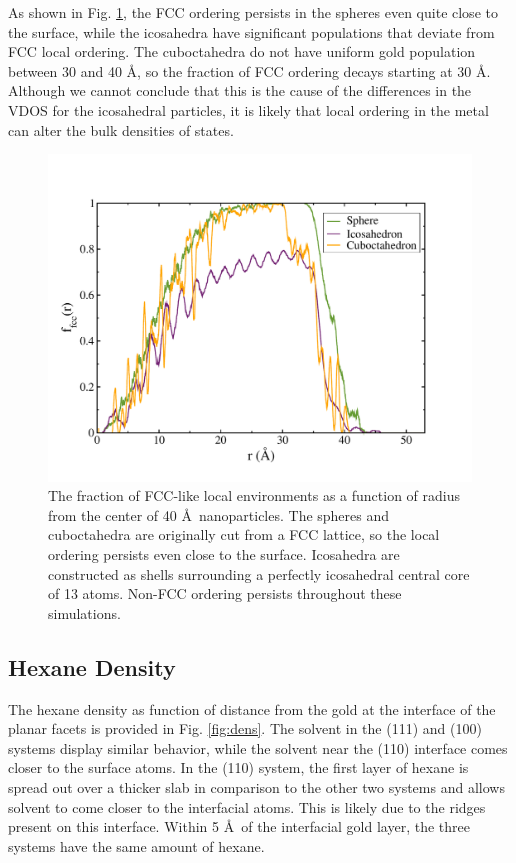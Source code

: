\documentclass[journal = jpccck, manuscript = suppinfo]{achemso}
\begin{document}
As shown in Fig. \ref{fig:struct-bowr}, the FCC ordering persists in
the spheres even quite close to the surface, while the icosahedra have
significant populations that deviate from FCC local ordering.  The
cuboctahedra do not have uniform gold population between 30 and 40
\AA, so the fraction of FCC ordering decays starting at 30 \AA.
Although we cannot conclude that this is the cause of the differences
in the VDOS for the icosahedral particles, it is likely that local
ordering in the metal can alter the bulk densities of states.

\begin{figure}[!htb]
	\includegraphics[width=5in]{figures/struct-bowr.pdf}
	\caption{The fraction of FCC-like local environments as a
          function of radius from the center of 40 \AA\ nanoparticles.
          The spheres and cuboctahedra are originally cut from a FCC
          lattice, so the local ordering persists even close to the
          surface.  Icosahedra are constructed as shells surrounding a
          perfectly icosahedral central core of 13 atoms. Non-FCC
          ordering persists throughout these simulations.}
 	\label{fig:struct-bowr}
 \end{figure}

\subsection{Hexane Density}
The hexane density as function of distance from the gold at the
interface of the planar facets is provided in Fig. \ref{fig:dens}. The
solvent in the (111) and (100) systems display similar behavior, while
the solvent near the (110) interface comes closer to the surface
atoms.  In the (110) system, the first layer of hexane is spread out
over a thicker slab in comparison to the other two systems and allows
solvent to come closer to the interfacial atoms.  This is likely due
to the ridges present on this interface.  Within 5 \AA\ of the
interfacial gold layer, the three systems have the same amount of
hexane.
\end{document}
